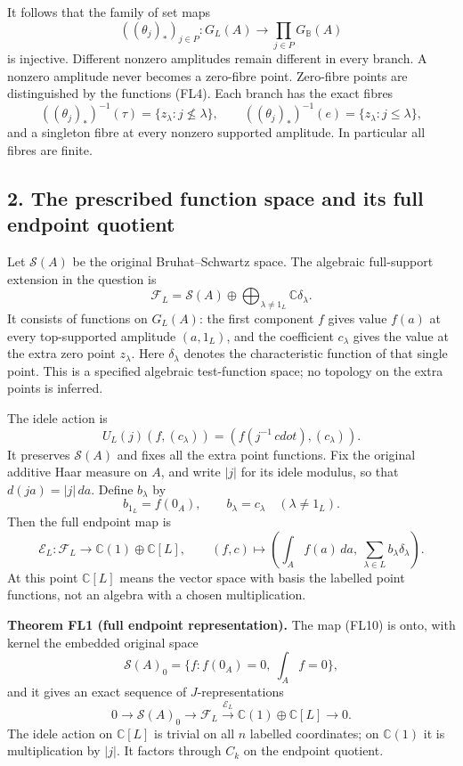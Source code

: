 \documentclass[
  10pt,
]{article}
\begin{document}
It follows that the family of set maps \[
((\theta_j)_*)_{j\in P}:G_L(A)\longrightarrow
\prod_{j\in P}G_{\mathbb B}(A)
\tag{FL5}
\] is injective. Different nonzero amplitudes remain different in every
branch. A nonzero amplitude never becomes a zero-fibre point. Zero-fibre
points are distinguished by the functions (FL4). Each branch has the
exact fibres \[
((\theta_j)_*)^{-1}(\tau)=\{z_\lambda:j\nleq\lambda\},\qquad
((\theta_j)_*)^{-1}(e)=\{z_\lambda:j\le\lambda\},
\tag{FL6}
\] and a singleton fibre at every nonzero supported amplitude. In
particular all fibres are finite.

\subsection{2. The prescribed function space and its full endpoint
quotient}\label{the-prescribed-function-space-and-its-full-endpoint-quotient}

Let \(\mathcal S(A)\) be the original Bruhat--Schwartz space. The
algebraic full-support extension in the question is \[
\mathcal F_L=\mathcal S(A)\oplus
\bigoplus_{\lambda\ne1_L}\mathbb C\delta_\lambda.
\tag{FL7}
\] It consists of functions on \(G_L(A)\): the first component \(f\)
gives value \(f(a)\) at every top-supported amplitude \((a,1_L)\), and
the coefficient \(c_\lambda\) gives the value at the extra zero point
\(z_\lambda\). Here \(\delta_\lambda\) denotes the characteristic
function of that single point. This is a specified algebraic
test-function space; no topology on the extra points is inferred.

The idele action is \[
U_L(j)(f,(c_\lambda))=(f(j^{-1}\,cdot),(c_\lambda)).
\tag{FL8}
\] It preserves \(\mathcal S(A)\) and fixes all the extra point
functions. Fix the original additive Haar measure on \(A\), and write
\(|j|\) for its idele modulus, so that \(d(ja)=|j|\,da\). Define
\(b_\lambda\) by \[
b_{1_L}=f(0_A),\qquad b_\lambda=c_\lambda\quad(\lambda\ne1_L).
\tag{FL9}
\] Then the full endpoint map is \[
\mathcal E_L:\mathcal F_L\to\mathbb C(1)\oplus\mathbb C[L],
\qquad(f,c)\mapsto\left(\int_A f(a)\,da,\ 
\sum_{\lambda\in L}b_\lambda\delta_\lambda\right).
\tag{FL10}
\] At this point \(\mathbb C[L]\) means the vector space with basis the
labelled point functions, not an algebra with a chosen multiplication.

\textbf{Theorem FL1 (full endpoint representation).} The map (FL10) is
onto, with kernel the embedded original space \[
\mathcal S(A)_0=\{f:f(0_A)=0,\ \int_Af=0\},
\tag{FL11}
\] and it gives an exact sequence of \(J\)-representations \[
0\to\mathcal S(A)_0\to\mathcal F_L
\xrightarrow{\mathcal E_L}\mathbb C(1)\oplus\mathbb C[L]\to0.
\tag{FL12}
\] The idele action on \(\mathbb C[L]\) is trivial on all \(n\) labelled
coordinates; on \(\mathbb C(1)\) it is multiplication by \(|j|\). It
factors through \(C_k\) on the endpoint quotient.
\end{document}
